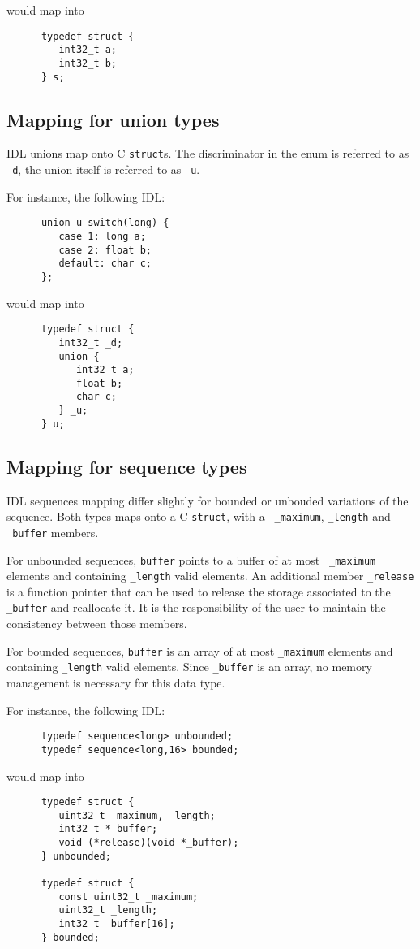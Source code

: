 would map into
\begin{verbatim}
      typedef struct {
         int32_t a;
         int32_t b;
      } s;
\end{verbatim}


\subsection{Mapping for union types}

\GenoM{}  IDL unions map onto  C {\tt  struct}s. The discriminator in the enum
is referred to as {\tt \_d}, the union itself is referred to as {\tt \_u}.

For instance, the following IDL:
\begin{verbatim}
      union u switch(long) {
         case 1: long a;
         case 2: float b;
         default: char c;
      };
\end{verbatim}

would map into
\begin{verbatim}
      typedef struct {
         int32_t _d;
         union {
            int32_t a;
            float b;
            char c;
         } _u;
      } u;
\end{verbatim}


\subsection{Mapping for sequence types}

\GenoM{}  IDL  sequences  mapping  differ  slightly  for  bounded  or  unbouded
variations of the sequence. Both types maps  onto a C {\tt struct}, with a {\tt
\_maximum}, {\tt \_length} and {\tt \_buffer} members.

For  unbounded sequences,  {\tt buffer}  points  to a  buffer of  at most  {\tt
\_maximum} elements and containing {\tt \_length} valid elements. An additional
member {\tt  \_release} is a function pointer  that can be used  to release the
storage  associated  to  the  {\tt  \_buffer}  and reallocate  it.  It  is  the
responsibility of the user to maintain the consistency between those members.

For bounded  sequences, {\tt  buffer} is  an array of  at most  {\tt \_maximum}
elements and containing {\tt \_length}  valid elements. Since {\tt \_buffer} is
an array, no memory management is necessary for this data type.

For instance, the following IDL:
\begin{verbatim}
      typedef sequence<long> unbounded;
      typedef sequence<long,16> bounded;
\end{verbatim}

would map into
\begin{verbatim}
      typedef struct {
         uint32_t _maximum, _length;
         int32_t *_buffer;
         void (*release)(void *_buffer);
      } unbounded;

      typedef struct {
         const uint32_t _maximum;
         uint32_t _length;
         int32_t _buffer[16];
      } bounded;
\end{verbatim}
